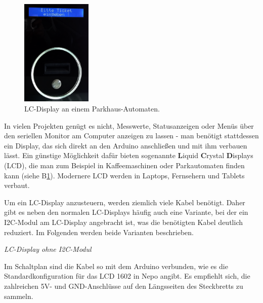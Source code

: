 \begin{figure}
	\centering
	\includegraphics[width=0.3\textwidth]{./pics/lcd-im-parkhaus-v2.png}
	\caption{LC-Display an einem Parkhaus-Automaten.}
	\label{abb:lcd-parkhaus}
	\vspace{-2\baselineskip}
\end{figure}
In vielen Projekten genügt es nicht, Messwerte, Statusanzeigen oder Menüs über den seriellen Monitor am Computer anzeigen zu lassen - man benötigt stattdessen ein Display, das sich direkt an den Arduino anschließen und mit ihm verbauen lässt. Ein günstige Möglichkeit dafür bieten sogenannte \textbf{L}iquid \textbf{C}rystal \textbf{D}isplays (LCD), die man zum Beispiel in Kaffeemaschinen oder Parkautomaten finden kann (siehe B\ref{abb:lcd-parkhaus}). Modernere LCD werden in Laptops, Fernsehern und Tablets verbaut.

Um ein LC-Display anzusteuern, werden ziemlich viele Kabel benötigt. Daher gibt es neben den normalen LC-Displays häufig auch eine Variante, bei der ein I2C-Modul am LC-Display angebracht ist, was die benötigten Kabel deutlich reduziert. Im Folgenden werden beide Varianten beschrieben.

\vspace{3\baselineskip}
\emph{LC-Display ohne I2C-Modul}

Im Schaltplan sind die Kabel so mit dem Arduino verbunden, wie es die Standardkonfiguration für das LCD 1602 in Nepo angibt. Es empfiehlt sich, die zahlreichen 5V- und GND-Anschlüsse auf den Längsseiten des Steckbretts zu sammeln.

